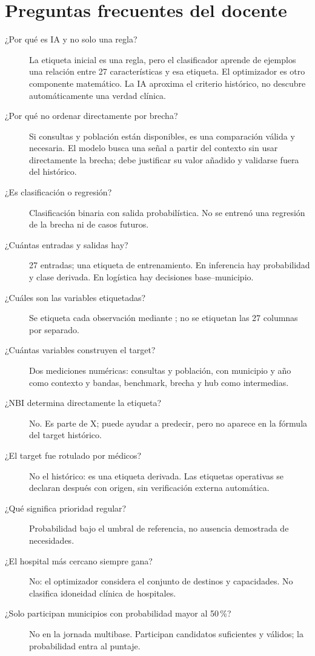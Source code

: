 \documentclass[11pt,a4paper]{report}
\newcommand{\campo}[1]{\texttt{\detokenize{#1}}}
\begin{document}
\section{Preguntas frecuentes del docente}
\begin{description}
\item[¿Por qué es IA y no solo una regla?] La etiqueta inicial es una regla, pero el clasificador aprende de ejemplos una relación entre 27 características y esa etiqueta. El optimizador es otro componente matemático. La IA aproxima el criterio histórico, no descubre automáticamente una verdad clínica.
\item[¿Por qué no ordenar directamente por brecha?] Si consultas y población están disponibles, es una comparación válida y necesaria. El modelo busca una señal a partir del contexto sin usar directamente la brecha; debe justificar su valor añadido y validarse fuera del histórico.
\item[¿Es clasificación o regresión?] Clasificación binaria con salida probabilística. No se entrenó una regresión de la brecha ni de casos futuros.
\item[¿Cuántas entradas y salidas hay?] 27 entradas; una etiqueta de entrenamiento. En inferencia hay probabilidad y clase derivada. En logística hay decisiones base--municipio.
\item[¿Cuáles son las variables etiquetadas?] Se etiqueta cada observación mediante \campo{prioridad_alta}; no se etiquetan las 27 columnas por separado.
\item[¿Cuántas variables construyen el target?] Dos mediciones numéricas: consultas y población, con municipio y año como contexto y bandas, benchmark, brecha y hub como intermedias.
\item[¿NBI determina directamente la etiqueta?] No. Es parte de X; puede ayudar a predecir, pero no aparece en la fórmula del target histórico.
\item[¿El target fue rotulado por médicos?] No el histórico: es una etiqueta derivada. Las etiquetas operativas se declaran después con origen, sin verificación externa automática.
\item[¿Qué significa prioridad regular?] Probabilidad bajo el umbral de referencia, no ausencia demostrada de necesidades.
\item[¿El hospital más cercano siempre gana?] No: el optimizador considera el conjunto de destinos y capacidades. No clasifica idoneidad clínica de hospitales.
\item[¿Solo participan municipios con probabilidad mayor al 50\,\%?] No en la jornada multibase. Participan candidatos suficientes y válidos; la probabilidad entra al puntaje.

\end{description}
\end{document}
